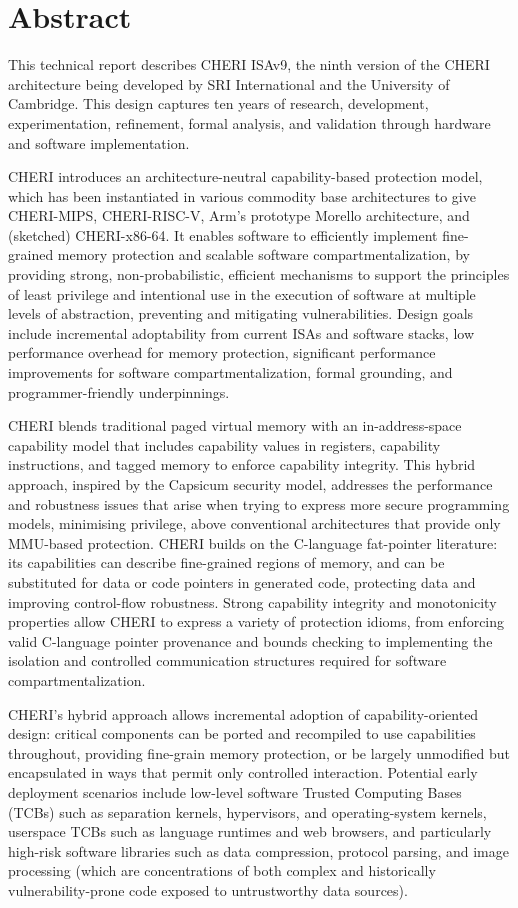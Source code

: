 \section*{Abstract}

This technical report describes CHERI ISAv9, the ninth version of the
CHERI architecture
being developed by SRI International and the University of Cambridge.
This design captures ten years of research, development, experimentation,
refinement, formal analysis, and validation through hardware and software
implementation.

CHERI introduces an architecture-neutral capability-based protection
model, which has been instantiated in various commodity base architectures
to give CHERI-MIPS,
CHERI-RISC-V, Arm's prototype Morello architecture, and (sketched)
CHERI-x86-64.
It enables software
to efficiently implement fine-grained memory protection and scalable software
compartmentalization, by providing strong, non-probabilistic, efficient
mechanisms to support the principles of least privilege and intentional use
in the execution of software at multiple levels of abstraction, preventing and
mitigating vulnerabilities.
Design goals include incremental adoptability from current ISAs and
software stacks, low performance overhead for memory protection, significant
performance improvements for software compartmentalization, formal grounding,
and programmer-friendly underpinnings.

CHERI blends traditional paged virtual memory with an
in-address-space capability model that includes capability values in registers,
capability instructions, and tagged memory to enforce capability integrity.
This hybrid approach, inspired by the Capsicum security model, addresses the performance and robustness issues that arise
when trying to express more secure programming models, minimising
privilege, above conventional architectures that provide only
MMU-based protection.
CHERI builds on the C-language fat-pointer literature: its capabilities can
describe fine-grained regions of memory, and can be substituted for data or
code pointers in generated code, protecting data and improving
control-flow robustness.
Strong capability integrity and monotonicity properties allow CHERI
to express a variety of protection idioms, from enforcing valid C-language
pointer provenance and bounds checking to implementing the isolation and
controlled communication structures required for software
compartmentalization.

CHERI's hybrid approach allows incremental adoption of capability-oriented design:
critical components can be ported and recompiled to use capabilities throughout,
providing fine-grain memory protection, or be largely unmodified but encapsulated in ways that permit
only controlled interaction. 
Potential early deployment scenarios include low-level software Trusted Computing
Bases (TCBs) such as separation kernels, hypervisors, and operating-system
kernels,  userspace TCBs such as language runtimes and web browsers, 
and particularly high-risk
software libraries such as data compression, protocol parsing, and image
processing (which are concentrations of both complex and historically
vulnerability-prone code exposed to untrustworthy data sources).

